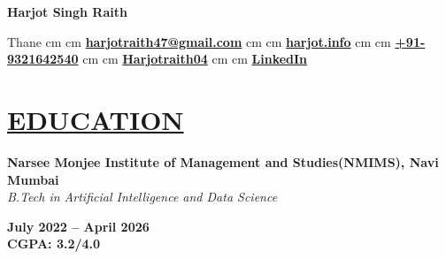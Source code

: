 \documentclass[10pt, letterpaper]{article}
\newenvironment{twocolentry}[2][]{
    \onecolentry
    \def\secondColumn{#2}
    \setcolumnwidth{\fill, 5.0 cm}
    \begin{paracol}{2}
}{
    \switchcolumn \raggedleft \secondColumn
    \end{paracol}
    \endonecolentry
} %
\newenvironment{header}{
    \setlength{\topsep}{0pt}\par\kern\topsep\centering\linespread{1.5}
}{
    \par\kern\topsep
} %
\newcommand{\placelastupdatedtext}{%
  \AddToShipoutPictureFG*{%
    \put(
        \LenToUnit{\paperwidth-2 cm-0.2 cm+0.05cm},
        \LenToUnit{\paperheight-1.0 cm}
    ){\vtop{{\null}\makebox[0pt][c]{
        \small\color{gray}\textit{}\hspace{\widthof{}}
    }}}%
  }%
}%
\let\hrefWithoutArrow\href
\let\hrefWithoutArrow\href
\begin{document}
    \fontsize{10.5pt}{12.5pt}\selectfont
    
    \newcommand{\AND}{\unskip
        \cleaders\copy\ANDbox\hskip\wd\ANDbox
        \ignorespaces
    }
    \newsavebox\ANDbox
    \sbox\ANDbox{}

   \placelastupdatedtext
    \begin{header}
    \textbf{\fontsize{26 pt}{26 pt}\selectfont Harjot Singh Raith}
    
    \vspace{0.15 cm}
    
    \normalsize
    \mbox{\textbf{\color{black}\footnotesize\faMapMarker*}\hspace*{0.08cm}Thane}%
     cm%
    \textbf{\textbar}%
     cm%
    \mbox{\hrefWithoutArrow{mailto:harjotraith47@gmail.com}{\textbf{\color{black}{\footnotesize\faEnvelope[regular]}\hspace*{0.08cm}harjotraith47@gmail.com}}}%
     cm%
    \textbf{\textbar}%
     cm%
    \mbox{\hrefWithoutArrow{https://www.harjot.info/}{\textbf{\color{black}{\footnotesize\faGlobe}\hspace{0.08cm}harjot.info}}}%
     cm%
    \textbf{\textbar}%
     cm%
    \mbox{\hrefWithoutArrow{tel:+91-9321642540}{\textbf{\color{black}{\footnotesize\faPhone*}\hspace*{0.08cm}+91-9321642540}}}%
     cm%
    \textbf{\textbar}%
     cm%
    \mbox{\hrefWithoutArrow{https://github.com/Harjotraith04}{\textbf{\color{black}{\footnotesize\faGithub}\hspace*{0.08cm}Harjotraith04}}}%
     cm%
    \textbf{\textbar}%
     cm%
    \mbox{\hrefWithoutArrow{https://www.linkedin.com/in/harjot-singh-raith-779a7028b}{\textbf{\color{black}{\footnotesize\faLinkedinIn}\hspace*{0.08cm}LinkedIn}}}%
\end{header}



    \section{\href{https://www.harjot.info/\#Education}{EDUCATION}}

\begin{twocolentry}{
             
\textbf{July 2022 – April 2026} \\ \textbf{CGPA: 3.2/4.0}}
   \textbf{Narsee Monjee Institute of Management and Studies(NMIMS), Navi Mumbai} \\
   \textit{B.Tech in Artificial Intelligence and Data Science}
\end{twocolentry}    
       
\end{document}
